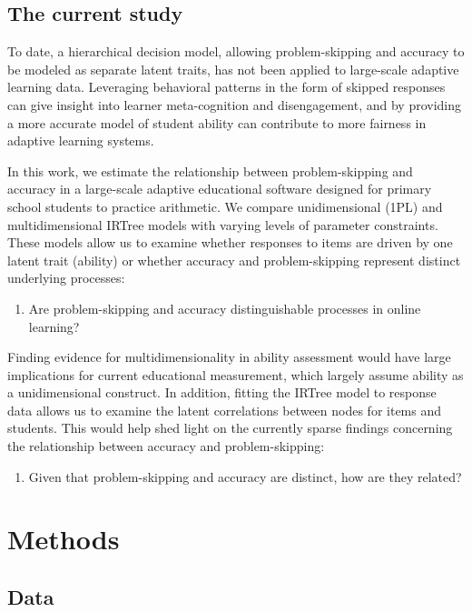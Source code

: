 \documentclass{edm_article}
\begin{document}
\subsection{The current study}
To date, a hierarchical decision model, allowing problem-skipping and accuracy to be modeled as separate latent traits, has not been applied to large-scale adaptive learning data.
Leveraging behavioral patterns in the form of skipped responses can give insight into learner meta-cognition and disengagement, and by providing a more accurate model of student ability can contribute to more fairness in adaptive learning systems. 

In this work, we estimate the relationship between problem-skipping and accuracy in a large-scale adaptive educational software designed for primary school students to practice arithmetic. We compare unidimensional (1PL) and multidimensional IRTree models with varying levels of parameter constraints. These models allow us to examine whether responses to items are driven by one latent trait (ability) or whether accuracy and problem-skipping represent distinct underlying processes:

\begin{enumerate}
    \item[\textbf{RQ1:}] Are problem-skipping and accuracy distinguishable processes in online learning?  
\end{enumerate}

Finding evidence for multidimensionality in ability assessment would have large implications for current educational measurement, which largely assume ability as a unidimensional construct. In addition, fitting the IRTree model to response data allows us to examine the latent correlations between nodes for items and students. This would help shed light on the currently sparse findings concerning the relationship between accuracy and problem-skipping: 

\begin{enumerate}
    \item[\textbf{RQ2:}] Given that problem-skipping and accuracy are distinct, how are they related? 
\end{enumerate}

\section{Methods}
\subsection{Data}
\end{document}
